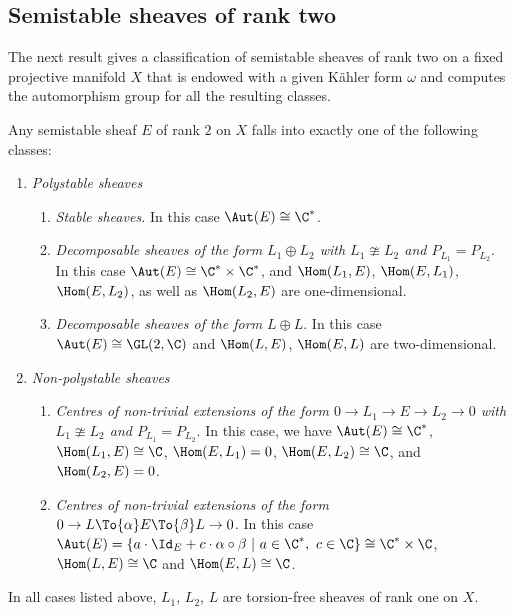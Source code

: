 \subsection{Semistable sheaves of rank two}\label{subsect:rank2}

The next result gives a classification of semistable sheaves of rank two on a fixed projective manifold $X$ that is endowed with a given Kähler form $\omega$ and computes the automorphism group for all the resulting classes.

\begin{Prop}\label{prop:ss sheaves}
Any semistable sheaf $E$ of rank $2$ on $X$ falls into exactly one of the following classes:
\begin{enumerate}
\item\label{prop:ss sheaves1} \emph{Polystable sheaves}
\begin{enumerate}
\item\label{prop:ss sheaves1a}
{\em Stable sheaves.} In this case $\Aut(E)\cong\C^*$.
\item\label{prop:ss sheaves1b}
{\em Decomposable sheaves of the form $L_1\oplus L_2$ with $L_1\ncong L_2$ and $P_{L_1}=P_{L_2}$}. In this case $\Aut(E)\cong\C^*\times \C^*$, and $\Hom(L_1,E)$, $\Hom(E, L_1)$, $\Hom(E,L_2)$, as well as $\Hom(L_2,E)$ are one-dimensional.
\item\label{prop:ss sheaves1c}
{\em Decomposable sheaves of the form $L\oplus L$}. In this case $\Aut(E)\cong\GL(2,\C)$ and $\Hom(L,E)$, $\Hom(E, L)$ are two-dimensional.
\end{enumerate}
\item\label{prop:ss sheaves2}
\emph{Non-polystable sheaves}
\begin{enumerate}
\item\label{prop:ss sheaves2a}
{\em Centres of non-trivial extensions of the form $0\to L_1\to E\to L_2\to 0$ with $L_1\ncong L_2$ and $P_{L_1}=P_{L_2}$}. In this case, we have $\Aut(E)\cong\C^*$, $\Hom(L_1,E)\cong\C$, $\Hom(E, L_1)=0$, $\Hom(E,L_2)\cong\C$, and $\Hom(L_2,E)=0$.
\item\label{prop:ss sheaves2b}
{\em Centres of non-trivial extensions of the form $0\to L\To{\alpha} E\To{\beta} L\to0$.} In this case $\Aut(E)=\{ a\cdot \Id_E+c\cdot\alpha\circ\beta \ | \ a\in\C^*, \ c\in\C\}\cong\C^*\times\C$, $\Hom(L,E)\cong\C$ and $\Hom(E,L)\cong\C$.
\end{enumerate}
\end{enumerate}
In all cases listed above, $L_1$, $L_2$, $L$ are torsion-free sheaves of rank one on $X$.
\end{Prop}
